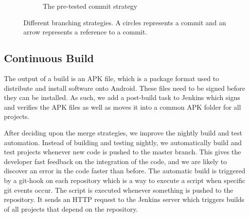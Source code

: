 \begin{figure}
\begin{subfigure}[b]{\linewidth}
\caption{The pre-tested commit strategy}\label{fig:commit_stratagy_b}
\end{subfigure}
\caption{Different branching strategies. A circles represents a commit and an arrow represents a reference to a commit.}\label{fig:commit_stratagy}
\end{figure}


\subsection{Continuous Build}
The output of a build is an APK file, which is a package format used to distribute and install software onto Android. These files need to be signed before they can be installed. As such, we add a post-build task to Jenkins which signs and verifies the APK files as well as moves it into a common APK folder for all projects.

After deciding upon the merge strategies, we improve the nightly build and test automation. Instead of building and testing nightly, we automatically build and test projects whenever new code is pushed to the master branch. This gives the developer fast feedback on the integration of the code, and we are likely to discover an error in the code faster than before. The automatic build is triggered by a git-hook on each repository which is a way to execute a script when specific git events occur. The script is executed whenever something is pushed to the repository. It sends an HTTP request to the Jenkins server which triggers builds of all projects that depend on the repository.

